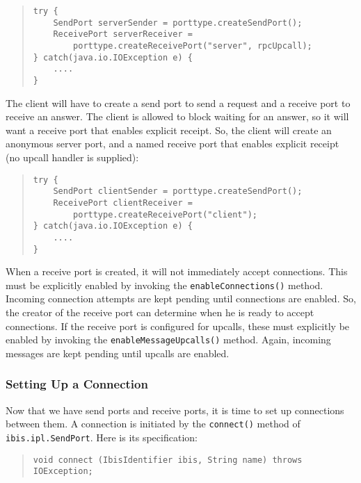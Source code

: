 \documentclass[10pt]{article}
\begin{document}
{\small
\begin{quote}
\begin{verbatim}
try {
    SendPort serverSender = porttype.createSendPort();
    ReceivePort serverReceiver =
        porttype.createReceivePort("server", rpcUpcall);
} catch(java.io.IOException e) {
    ....
}
\end{verbatim}
\end{quote}
}

\noindent
The client will have to create a send port
to send a request and a receive port to receive an answer.
The client is allowed to block waiting for an answer, so it will
want a receive port that enables explicit receipt.
So, the client will create an anonymous server port, and a named
receive port that enables explicit receipt (no upcall handler is supplied):
{\small
\begin{quote}
\begin{verbatim}
try {
    SendPort clientSender = porttype.createSendPort();
    ReceivePort clientReceiver =
        porttype.createReceivePort("client");
} catch(java.io.IOException e) {
    ....
}
\end{verbatim}
\end{quote}
}

\noindent
When a receive port is created, it will not immediately accept connections.
This must be explicitly enabled by
invoking the \texttt{enableConnections()} method.
Incoming connection attempts are kept pending until connections are enabled.
So, the creator of
the receive port can determine when he is ready to accept connections.
If the receive port is configured for upcalls, these must
explicitly be enabled by invoking the \texttt{enableMessageUpcalls()} method.
Again, incoming messages are kept pending until upcalls are enabled.

\subsubsection{Setting Up a Connection}

Now that we have send ports and receive ports, it is time to set up
connections between them.
A connection is initiated by the \texttt{connect()} method of
\texttt{ibis.ipl.SendPort}.
Here is its specification:

{\small
\begin{quote}
\begin{verbatim}
void connect (IbisIdentifier ibis, String name) throws IOException;
\end{verbatim}
\end{quote}
}
\end{document}
